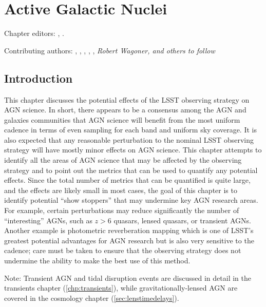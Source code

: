 
\chapter[AGN]{Active Galactic Nuclei}
\def\chpname{agn}\label{chp:\chpname}

Chapter editors:
,
.

Contributing authors:
,
,
,
,
,
{\it Robert Wagoner, and others to follow}


\section{Introduction}
\label{sec:\chpname:intro}


This chapter discusses the potential effects of the LSST observing
strategy on AGN science. In short, there appears to be a consensus
among the AGN and galaxies communities that AGN science will benefit
from the most uniform cadence in terms of even sampling for each band
and uniform sky coverage. It is also expected that any reasonable
perturbation to the nominal LSST observing strategy will have mostly
minor effects on AGN science. This chapter attempts to identify all
the areas of AGN science that may be affected by the observing strategy
and to point out the metrics that can be used to quantify any potential
effects. Since the total number of metrics that can be quantified is
quite large, and the effects are likely small in most cases, the goal
of this chapter is to identify potential ``show stoppers'' that may undermine
key AGN research areas. For example, certain perturbations may reduce
significantly the number of ``interesting'' AGNs, such as $z>6$ quasars,
lensed quasars, or transient AGNs. Another example is photometric
reverberation mapping which is one of LSST's greatest potential advantages for
AGN research but is also very sensitive to the cadence; care must be
taken to ensure that the observing strategy does not undermine the
ability to make the best use of this method.

Note: Transient AGN and tidal disruption events are discussed in
detail in the transients chapter
(\autoref{chp:transients}), while gravitationally-lensed AGN are
covered in the cosmology chapter (\autoref{sec:lenstimedelays}).


